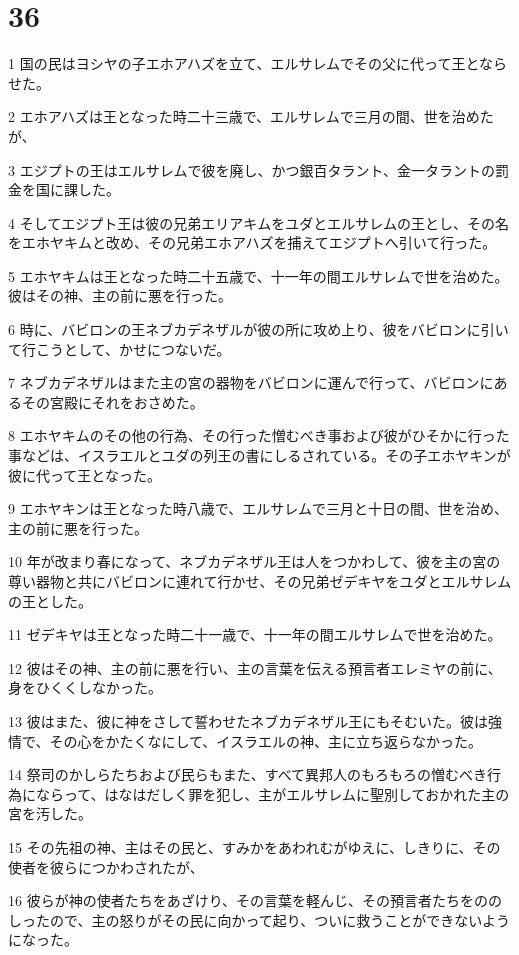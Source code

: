 \chapter{36}

\par 1 国の民はヨシヤの子エホアハズを立て、エルサレムでその父に代って王とならせた。
\par 2 エホアハズは王となった時二十三歳で、エルサレムで三月の間、世を治めたが、
\par 3 エジプトの王はエルサレムで彼を廃し、かつ銀百タラント、金一タラントの罰金を国に課した。
\par 4 そしてエジプト王は彼の兄弟エリアキムをユダとエルサレムの王とし、その名をエホヤキムと改め、その兄弟エホアハズを捕えてエジプトへ引いて行った。
\par 5 エホヤキムは王となった時二十五歳で、十一年の間エルサレムで世を治めた。彼はその神、主の前に悪を行った。
\par 6 時に、バビロンの王ネブカデネザルが彼の所に攻め上り、彼をバビロンに引いて行こうとして、かせにつないだ。
\par 7 ネブカデネザルはまた主の宮の器物をバビロンに運んで行って、バビロンにあるその宮殿にそれをおさめた。
\par 8 エホヤキムのその他の行為、その行った憎むべき事および彼がひそかに行った事などは、イスラエルとユダの列王の書にしるされている。その子エホヤキンが彼に代って王となった。
\par 9 エホヤキンは王となった時八歳で、エルサレムで三月と十日の間、世を治め、主の前に悪を行った。
\par 10 年が改まり春になって、ネブカデネザル王は人をつかわして、彼を主の宮の尊い器物と共にバビロンに連れて行かせ、その兄弟ゼデキヤをユダとエルサレムの王とした。
\par 11 ゼデキヤは王となった時二十一歳で、十一年の間エルサレムで世を治めた。
\par 12 彼はその神、主の前に悪を行い、主の言葉を伝える預言者エレミヤの前に、身をひくくしなかった。
\par 13 彼はまた、彼に神をさして誓わせたネブカデネザル王にもそむいた。彼は強情で、その心をかたくなにして、イスラエルの神、主に立ち返らなかった。
\par 14 祭司のかしらたちおよび民らもまた、すべて異邦人のもろもろの憎むべき行為にならって、はなはだしく罪を犯し、主がエルサレムに聖別しておかれた主の宮を汚した。
\par 15 その先祖の神、主はその民と、すみかをあわれむがゆえに、しきりに、その使者を彼らにつかわされたが、
\par 16 彼らが神の使者たちをあざけり、その言葉を軽んじ、その預言者たちをののしったので、主の怒りがその民に向かって起り、ついに救うことができないようになった。
